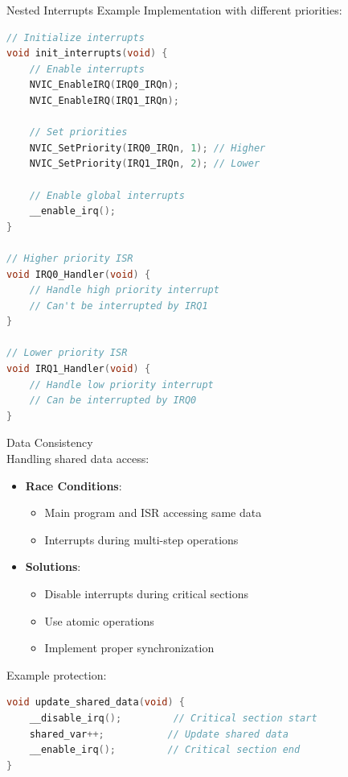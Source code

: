 \begin{example2}{Nested Interrupts Example}
Implementation with different priorities:
\begin{lstlisting}[language=C, style=basesmol]
// Initialize interrupts
void init_interrupts(void) {
    // Enable interrupts
    NVIC_EnableIRQ(IRQ0_IRQn);
    NVIC_EnableIRQ(IRQ1_IRQn);
    
    // Set priorities
    NVIC_SetPriority(IRQ0_IRQn, 1); // Higher
    NVIC_SetPriority(IRQ1_IRQn, 2); // Lower
    
    // Enable global interrupts
    __enable_irq();
}

// Higher priority ISR
void IRQ0_Handler(void) {
    // Handle high priority interrupt
    // Can't be interrupted by IRQ1
}

// Lower priority ISR
void IRQ1_Handler(void) {
    // Handle low priority interrupt
    // Can be interrupted by IRQ0
}
\end{lstlisting}
\end{example2}

\begin{concept}{Data Consistency}\\
Handling shared data access:
\begin{itemize}
  \item \textbf{Race Conditions}:
    \begin{itemize}
      \item Main program and ISR accessing same data
      \item Interrupts during multi-step operations
    \end{itemize}
  \item \textbf{Solutions}:
    \begin{itemize}
      \item Disable interrupts during critical sections
      \item Use atomic operations
      \item Implement proper synchronization
    \end{itemize}
\end{itemize}

Example protection:
\begin{lstlisting}[language=C, style=basesmol]
void update_shared_data(void) {
    __disable_irq();         // Critical section start
    shared_var++;           // Update shared data
    __enable_irq();         // Critical section end
}
\end{lstlisting}
\end{concept}

